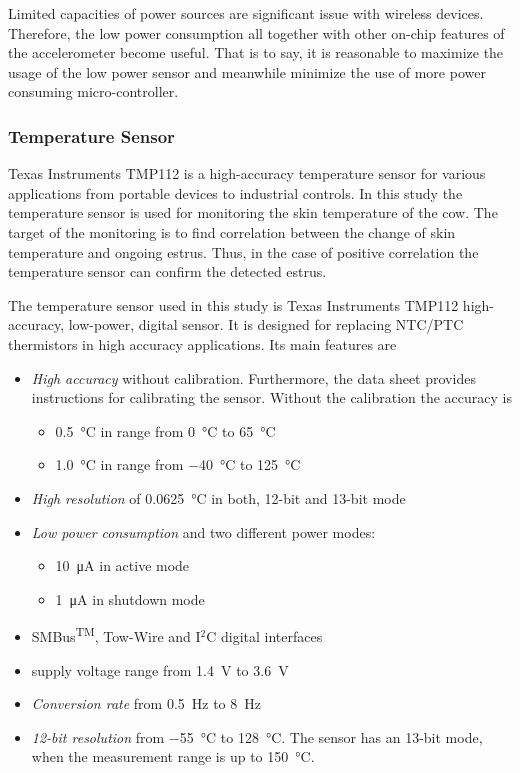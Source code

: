 \documentclass[english,12pt,a4paper,pdftex,elec,utf8]{aaltothesis}
\begin{document}
Limited capacities of power sources are significant issue with wireless devices. Therefore, the low power consumption all together with other on-chip features of the accelerometer become useful. That is to say, it is reasonable to maximize the usage of the low power sensor and meanwhile minimize the use of more power consuming micro-controller. 



\subsubsection*{Temperature Sensor}

Texas Instruments TMP112 is a high-accuracy temperature sensor for various applications from portable devices to industrial controls. In this study the temperature sensor is used for monitoring the skin temperature of the cow. The target of the monitoring is to find correlation between the change of skin temperature and ongoing estrus. Thus, in the case of positive correlation the temperature sensor can confirm the detected estrus. 

The temperature sensor used in this study is Texas Instruments TMP112 high-accuracy, low-power, digital sensor. It is designed for replacing NTC/PTC thermistors in high accuracy applications. Its main features are 

\begin{itemize}
\item \textit{High accuracy} without calibration. Furthermore, the data sheet provides instructions for calibrating the sensor. Without the calibration the accuracy is
\begin{itemize}
\item \SI{0.5}{\celsius} in range from \SI{0}{\celsius} to \SI{65}{\celsius}
\item \SI{1.0}{\celsius} in range from \SI{-40}{\celsius} to \SI{125}{\celsius}
\end{itemize} 
\item \textit{High resolution} of \SI{0.0625}{\celsius} in both, 12-bit and 13-bit mode
\item \textit{Low power consumption} and two different power modes:
\begin{itemize}
\item \SI{10}{\micro \ampere} in active mode
\item \SI{1}{\micro \ampere} in shutdown mode
\end{itemize}
\item SMBus\textsuperscript{TM}, Tow-Wire and I$^2$C digital interfaces
\item supply voltage range from \SI{1.4}{\volt} to \SI{3.6}{\volt}
\item \textit{Conversion rate} from \SI{0.5}{\hertz}  to \SI{8}{\hertz}
\item \textit{12-bit resolution} from \SI{-55}{\celsius} to \SI{128}{\celsius}. The sensor has an 13-bit mode, when the measurement range is up to \SI{150}{\celsius}.
\end{itemize} \cite{tmp112datasheet}
\end{document}
